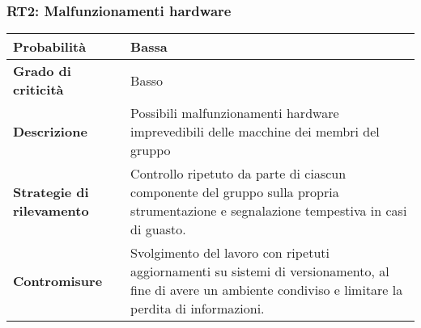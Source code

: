 \subsubsection{RT2: Malfunzionamenti hardware}

\bgroup
\begin{adjustwidth}{-0.5cm}{-0.5cm}
 	\begin{longtable}{P{4.5cm}|>{\justifying \arraybackslash}P{9cm}}

		\textbf{Probabilità} & Bassa \\
        \hline
        \textbf{Grado di criticità} & Basso \\
        \hline
        \textbf{Descrizione} & Possibili malfunzionamenti hardware imprevedibili delle macchine dei membri del gruppo \\
        \hline
        \textbf{Strategie di rilevamento} & Controllo ripetuto da parte di ciascun componente del gruppo sulla propria strumentazione e segnalazione tempestiva in casi di guasto. \\
        \hline
        \textbf{Contromisure} & Svolgimento del lavoro con ripetuti aggiornamenti su sistemi di versionamento, al fine di avere un ambiente condiviso e limitare la perdita di informazioni.  
	\end{longtable}
\end{adjustwidth}
\egroup